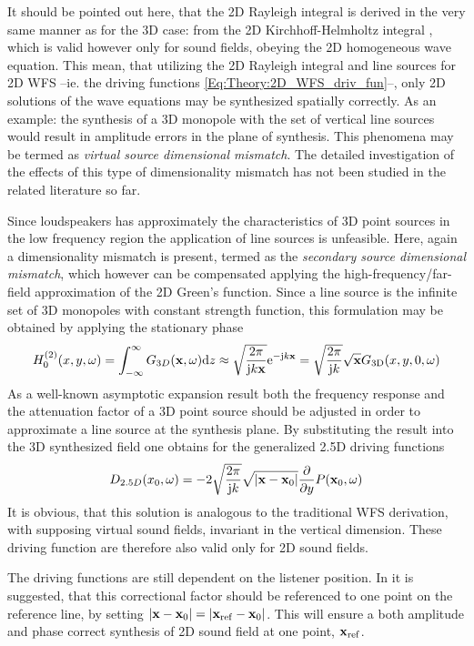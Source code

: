 It should be pointed out here, that the 2D Rayleigh integral is derived in the very same manner as for the 3D case: from the 2D Kirchhoff-Helmholtz integral \cite[Sect.8.6.2]{Williams1999}, which is valid however only for sound fields, obeying the 2D homogeneous wave equation. This mean, that utilizing the 2D Rayleigh integral and line sources for 2D WFS --ie. the driving functions \eqref{Eq:Theory:2D_WFS_driv_fun}--, only 2D solutions of the wave equations may be synthesized spatially correctly. As an example: the synthesis of a 3D monopole with the set of vertical line sources would result in amplitude errors in the plane of synthesis. This phenomena may be termed as \emph{virtual source dimensional mismatch}. The detailed investigation of the effects of this type of dimensionality mismatch has not been studied in the related literature so far.

Since loudspeakers has approximately the characteristics of 3D point sources in the low frequency region the application of line sources is unfeasible. 
Here, again a dimensionality mismatch is present, termed as the \emph{secondary source dimensional mismatch}, which however can be compensated applying the high-frequency/far-field approximation of the 2D Green's function. Since a line source is the infinite set of 3D monopoles with constant strength function, this formulation may be obtained by applying the stationary phase
\begin{equation}
H_0^{(2)}(x,y,\omega) = \int_{-\infty}^{\infty} G_{3D}( \mathbf{x}, \omega) \mathrm{d} z \approx \sqrt{\frac{2\pi}{\mathrm{j} k \mathbf{x}}}\mathrm{e}^{-\mathrm{j} k \mathbf{x}}
=
\sqrt{\frac{2\pi}{\mathrm{j} k}} \sqrt{\mathbf{x}} G_{\mathrm{3D}}(x,y,0,\omega)
\end{equation}
As a well-known asymptotic expansion result both the frequency response and the attenuation factor of a 3D point source should be adjusted in order to approximate a line source at the synthesis plane. By substituting the result into the 3D synthesized field one obtains for the generalized 2.5D driving functions
\begin{equation}
D_{2.5D}(x_0,\omega) =  -2\sqrt{\frac{2\pi}{\mathrm{j} k}}\sqrt{|\mathbf{x}-\mathbf{x}_0|} \frac{\partial}{\partial y} P(\mathbf{x}_0,\omega)
\end{equation}
It is obvious, that this solution is analogous to the traditional WFS derivation, with supposing virtual sound fields, invariant in the vertical dimension. These driving function are therefore also valid only for 2D sound fields.

The driving functions are still dependent on the listener position. 
In \cite{Spors2008:WFSrevisited} it is suggested, that this correctional factor should be referenced to one point on the reference line, by setting $|\mathbf{x} - \mathbf{x}_0| = |\mathbf{x}_{\mathrm{ref}}- \mathbf{x}_0|$. This will ensure a both amplitude and phase correct synthesis of 2D sound field at one point, $\mathbf{x}_{\mathrm{ref}}$.

